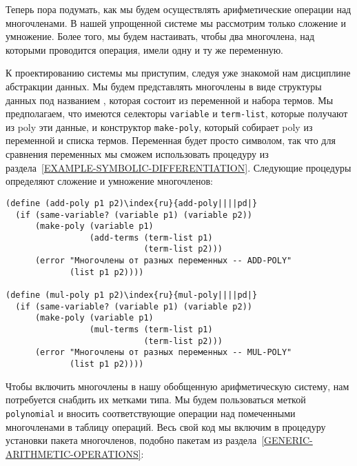 Теперь пора подумать, как мы будем осуществлять
арифметические операции над многочленами. В нашей упрощенной системе мы
рассмотрим только сложение и умножение.  Более того, мы будем
настаивать, чтобы два многочлена, над которыми проводится операция,
имели одну и ту же переменную.

К проектированию системы мы приступим, следуя уже
знакомой нам дисциплине абстракции данных. Мы будем
представлять многочлены в виде структуры данных под названием  
, которая состоит из переменной
и набора
термов.  Мы предполагаем, что имеются селекторы {\tt variable}
и {\tt term-list}, которые получают из poly эти данные, и
конструктор {\tt make-poly}, который собирает poly из
переменной и списка термов.  Переменная будет просто символом, так что
для сравнения переменных
мы сможем использовать процедуру   из
раздела~\ref{EXAMPLE-SYMBOLIC-DIFFERENTIATION}.  Следующие
процедуры определяют  сложение и  умножение многочленов: 

\begin{Verbatim}[fontsize=\small]
(define (add-poly p1 p2)\index{ru}{add-poly||||pd|}
  (if (same-variable? (variable p1) (variable p2))
      (make-poly (variable p1)
                 (add-terms (term-list p1)
                            (term-list p2)))
      (error "Многочлены от разных переменных -- ADD-POLY"
             (list p1 p2))))

(define (mul-poly p1 p2)\index{ru}{mul-poly||||pd|}
  (if (same-variable? (variable p1) (variable p2))
      (make-poly (variable p1)
                 (mul-terms (term-list p1)
                            (term-list p2)))
      (error "Многочлены от разных переменных -- MUL-POLY"
             (list p1 p2))))
\end{Verbatim}

Чтобы включить многочлены в нашу обобщенную
арифметическую систему, нам потребуется снабдить их метками типа.  Мы
будем пользоваться меткой {\tt polynomial} и вносить
соответствующие операции над помеченными многочленами в таблицу
операций.  Весь свой код мы включим в процедуру установки пакета
многочленов, подобно пакетам из 
раздела~\ref{GENERIC-ARITHMETIC-OPERATIONS}:

